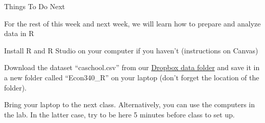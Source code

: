 \documentclass{./../div_teaching_slides}
\begin{document}
%


\begin{frame}{Things To Do Next}
\vspace{-0.5em}
\begin{witemize}
\item For the rest of this week and next week, we will learn how to prepare and analyze data in R
\item Install R and R Studio on your computer if you haven't (instructions on Canvas)
\item Download the dataset ``caschool.csv'' from our \href{https://www.dropbox.com/sh/9x7ac4qwnddl650/AAAP1FdTpFp2rXyZ6t-9-qqTa?dl=0}{Dropbox data folder} and save it in a new folder called ``Econ340\_R'' on your laptop (don't forget the location of the folder).
\item Bring your laptop to the next class. Alternatively, you can use the computers in the lab. In the latter case, try to be here 5 minutes before class to set up.
\end{witemize}
\end{frame}
\end{document}
